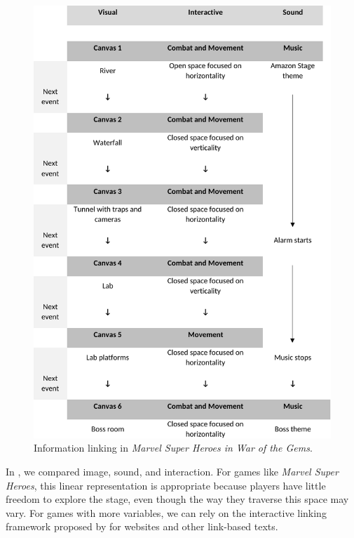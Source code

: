 \documentclass[english]{textolivre}
\begin{document}
\begin{figure}[htbp]
 \centering
 \begin{minipage}{.95\textwidth}
 \includegraphics[width=\textwidth]{fig-3.pdf}
 \caption{Information linking in \textit{Marvel Super Heroes in War of the Gems}.}
 \label{fig03}
 \end{minipage}
\end{figure}

In , we compared image, sound, and interaction. For games like \textit{Marvel Super Heroes}, this linear representation is appropriate because players have little freedom to explore the stage, even though the way they traverse this space may vary. For games with more variables, we can rely on the interactive linking framework proposed by \textcite[p. 237]{van_leeuwen_introducing_2005} for websites and other link-based texts.
\end{document}
